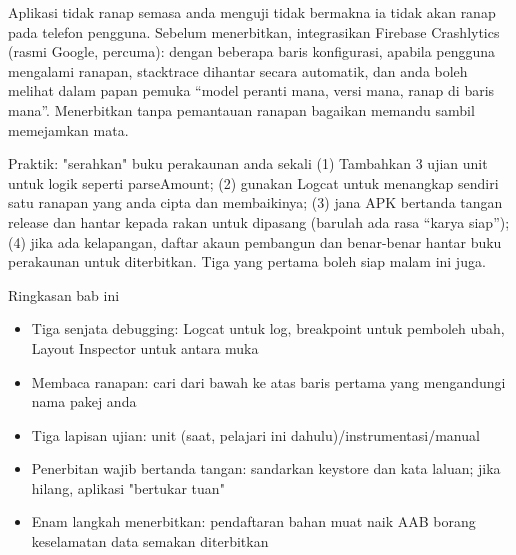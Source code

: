 
Aplikasi tidak ranap semasa anda menguji tidak bermakna ia tidak akan ranap pada telefon pengguna. Sebelum menerbitkan, integrasikan Firebase Crashlytics (rasmi Google, percuma): dengan beberapa baris konfigurasi, apabila pengguna mengalami ranapan, stacktrace dihantar secara automatik, dan anda boleh melihat dalam papan pemuka “model peranti mana, versi mana, ranap di baris mana”. Menerbitkan tanpa pemantauan ranapan bagaikan memandu sambil memejamkan mata.

\begin{tcbpractice}{Praktik: "serahkan" buku perakaunan anda sekali}
(1) Tambahkan 3 ujian unit untuk logik seperti parseAmount; (2) gunakan Logcat untuk menangkap sendiri satu ranapan yang anda cipta dan membaikinya; (3) jana APK bertanda tangan release dan hantar kepada rakan untuk dipasang (barulah ada rasa “karya siap”); (4) jika ada kelapangan, daftar akaun pembangun dan benar-benar hantar buku perakaunan untuk diterbitkan. Tiga yang pertama boleh siap malam ini juga.

\end{tcbpractice}

\begin{tcbsummary}{Ringkasan bab ini}
\begin{itemize}
  \item Tiga senjata debugging: Logcat untuk log, breakpoint untuk pemboleh ubah, Layout Inspector untuk antara muka
  \item Membaca ranapan: cari dari bawah ke atas baris pertama yang mengandungi nama pakej anda
  \item Tiga lapisan ujian: unit (saat, pelajari ini dahulu)/instrumentasi/manual
  \item Penerbitan wajib bertanda tangan: sandarkan keystore dan kata laluan; jika hilang, aplikasi "bertukar tuan"
  \item Enam langkah menerbitkan: pendaftaran bahan muat naik AAB borang keselamatan data semakan diterbitkan
\end{itemize}

\end{tcbsummary}
